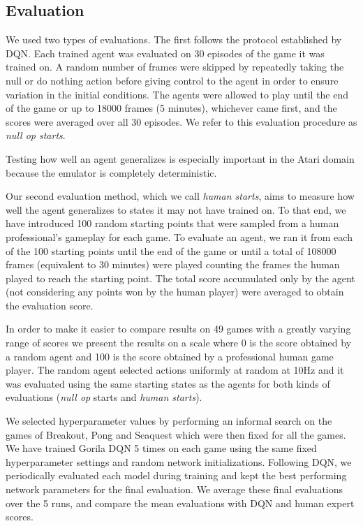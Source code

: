 \documentclass{article}
\begin{document}
\subsection{Evaluation}

We used two types of evaluations.
The first follows the protocol established by DQN. Each trained agent was evaluated on 30 episodes of the game it was trained on.
A random  number of frames were skipped by repeatedly taking the null or do nothing action before giving control to the agent in order to ensure variation in the initial conditions.
The agents were allowed to play until the end of the game or up to 18000 frames (5 minutes), whichever came first, and the scores were averaged over all 30 episodes. We refer to this evaluation procedure as {\it null op starts}.

Testing how well an agent generalizes is especially important in the Atari domain because the emulator is completely deterministic.

Our second evaluation method, which we call {\it human starts}, aims to measure how well the agent generalizes to states it may not have trained on. To that end, we have introduced 100 random starting points that were sampled from a human professional's gameplay for each game.
To evaluate an agent, we ran it from each of the 100 starting points until the end of the game or until a total of 108000 frames (equivalent to 30 minutes) were played counting the frames the human played to reach the starting point.
The total score accumulated only by the agent (not considering any points won by the human player) were averaged to obtain the evaluation score.


In order to make it easier to compare results on 49 games with a greatly varying range of scores we present the results on a scale where 0 is the score obtained by a random agent and 100 is the score obtained by a professional human game player.
The random agent selected actions uniformly at random at 10Hz and it was evaluated using the same starting states as the agents for both kinds of evaluations ({\it null op} starts and {\it human starts}).

We selected hyperparameter values by performing an informal search on the games of Breakout, Pong and Seaquest which were then fixed for all the games.
We have trained Gorila DQN 5 times on each game using the same fixed hyperparameter settings and random network initializations. Following DQN, we periodically evaluated each model during training and kept the best performing network parameters for the final evaluation. We average these final evaluations over the 5 runs, and compare the mean evaluations with DQN and human expert scores.
\end{document}
